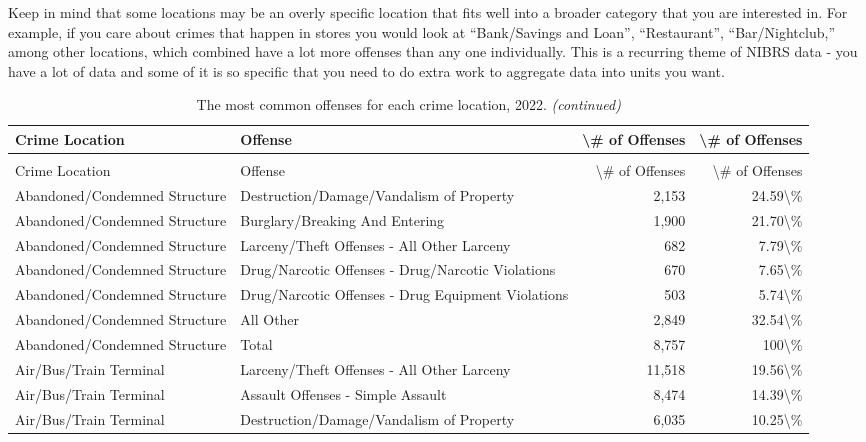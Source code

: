 \documentclass[
]{krantz}
\begin{document}
Keep in mind that some locations may be an overly specific
location that fits well into a broader category that you are
interested in. For example, if you care about crimes that
happen in stores you would look at ``Bank/Savings and
Loan'', ``Restaurant'', ``Bar/Nightclub,'' among other
locations, which combined have a lot more offenses than any
one individually. This is a recurring theme of NIBRS data -
you have a lot of data and some of it is so specific that
you need to do extra work to aggregate data into units you
want.

\begin{longtable}[t]{l|l|r|r}
\caption{\label{tab:offenseLocation}The most common offenses for each crime location, 2022.}\\
\hline
Crime Location & Offense & \textbackslash{}\# of Offenses & \textbackslash{}\# of Offenses\\
\hline
\endfirsthead
\caption[]{\label{tab:offenseLocation}The most common offenses for each crime location, 2022. \textit{(continued)}}\\
\hline
Crime Location & Offense & \textbackslash{}\# of Offenses & \textbackslash{}\# of Offenses\\
\hline
\endhead
Abandoned/Condemned Structure & Destruction/Damage/Vandalism of Property & 2,153 & 24.59\textbackslash{}\%\\
\hline
Abandoned/Condemned Structure & Burglary/Breaking And Entering & 1,900 & 21.70\textbackslash{}\%\\
\hline
Abandoned/Condemned Structure & Larceny/Theft Offenses - All Other Larceny & 682 & 7.79\textbackslash{}\%\\
\hline
Abandoned/Condemned Structure & Drug/Narcotic Offenses - Drug/Narcotic Violations & 670 & 7.65\textbackslash{}\%\\
\hline
Abandoned/Condemned Structure & Drug/Narcotic Offenses - Drug Equipment Violations & 503 & 5.74\textbackslash{}\%\\
\hline
Abandoned/Condemned Structure & All Other & 2,849 & 32.54\textbackslash{}\%\\
\hline
Abandoned/Condemned Structure & Total & 8,757 & 100\textbackslash{}\%\\
\hline
Air/Bus/Train Terminal & Larceny/Theft Offenses - All Other Larceny & 11,518 & 19.56\textbackslash{}\%\\
\hline
Air/Bus/Train Terminal & Assault Offenses - Simple Assault & 8,474 & 14.39\textbackslash{}\%\\
\hline
Air/Bus/Train Terminal & Destruction/Damage/Vandalism of Property & 6,035 & 10.25\textbackslash{}\%\\

\end{longtable}
\end{document}
